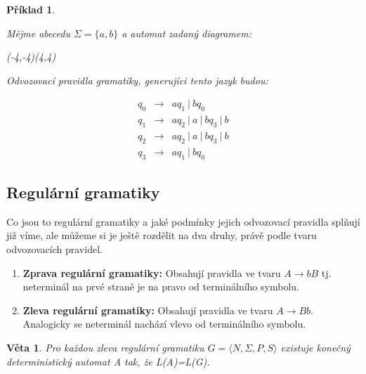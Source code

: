 \documentclass[10pt, a4paper, titlepage]{article}
\theoremstyle{note}
\newtheorem{veta}{\textbf{Věta}}
\newtheorem{priklad}{\textbf{Příklad}}
\begin{document}
\begin{priklad}\label{priklad-4}

Mějme abecedu $\Sigma = \lbrace a,b \rbrace$ a automat zadaný diagramem:
\begin{center}
\begin{VCPicture}{(-4,-4)(4,4)}
\end{VCPicture}
\end{center}

Odvozovací pravidla gramatiky, generujíci tento jazyk budou:

\begin{eqnarray*}
q_0 &\rightarrow& aq_1\ |\ bq_0 \\
q_1 &\rightarrow& aq_2\ |\ a\ |\ bq_3\ |\  b \\
q_2 &\rightarrow& aq_2\ |\ a\ |\ bq_3\ |\  b \\
q_3 &\rightarrow& aq_1\ |\ bq_0
\end{eqnarray*}

\end{priklad}

\subsection{Regulární gramatiky}

Co jsou to regulární gramatiky a jaké podmínky jejich odvozovací pravidla splňují již víme, ale můžeme si je ještě rozdělit na dva druhy, právě podle tvaru odvozovacích pravidel.

\begin{enumerate}

\item
\textbf{Zprava regulární gramatiky:}
Obsahují pravidla ve tvaru $ A \rightarrow bB $ tj. neterminál na prvé straně je na pravo od terminálního symbolu.
\item
\textbf{Zleva regulární gramatiky:}
Obsahují pravidla ve tvaru $ A \rightarrow Bb $. Analogicky se neterminál nachází vlevo od terminálního symbolu.
\end{enumerate}

\begin{veta}
Pro každou zleva regulární gramatiku $ G = \langle N,\Sigma,P,S \rangle $ existuje konečný deterministický automat \textit{A} tak, že \textit{L(A)=L(G)}.
\end{veta}
\end{document}
